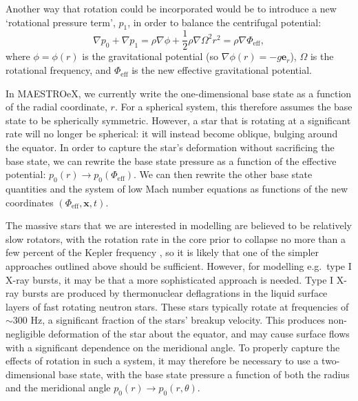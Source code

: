 \documentclass[a4paper]{jpconf}
\newcommand{\maestroex}{{\sffamily MAESTROeX}}
\begin{document}
Another way that rotation could be incorporated would be to introduce a new `rotational pressure term', $p_1$, in order to balance the centrifugal potential:
\begin{equation}
    \nabla p_0 + \nabla p_1 = \rho \nabla \phi + \frac{1}{2}\rho \nabla\Omega^2 r^2 = \rho \nabla \Phi_{\text{eff}},
\end{equation}
where $\phi = \phi(r)$ is the gravitational potential (so $\nabla \phi(r) = -g \bm{e}_r$), $\Omega$ is the rotational frequency, and $\Phi_{\text{eff}}$ is the new effective gravitational potential. 

In \maestroex, we currently write the one-dimensional base state as a function of the radial coordinate, $r$. For a spherical system, this therefore assumes the base state to be spherically symmetric. However, a star that is rotating at a significant rate will no longer be spherical: it will instead become oblique, bulging around the equator. In order to capture the star's deformation without sacrificing the base state, we can rewrite the base state pressure as a function of the effective potential: $p_0(r)\rightarrow p_0(\Phi_{\text{eff}})$. We can then rewrite the other base state quantities and the system of low Mach number equations as functions of the new coordinates $(\Phi_\text{eff}, \bm{x}, t)$.

The massive stars that we are interested in modelling are believed to be relatively slow rotators, with the rotation rate in the core prior to collapse no more than a few percent of the Kepler frequency \cite{heger2004presupernova}, so it is likely that one of the simpler approaches outlined above should be sufficient. However, for modelling e.g.~type I X-ray bursts, it may be that a more sophisticated approach is needed. Type I X-ray bursts are produced by thermonuclear deflagrations in the liquid surface layers of fast rotating neutron stars. These stars typically rotate at frequencies of $\sim$300 Hz, a significant fraction of the stars' breakup velocity. This produces non-negligible deformation of the star about the equator, and may cause surface flows with a significant dependence on the meridional angle. To properly capture the effects of rotation in such a system, it may therefore be necessary to use a two-dimensional base state, with the base state pressure a function of both the radius and the meridional angle $p_0(r)\rightarrow p_0(r, \theta)$.


\end{document}
